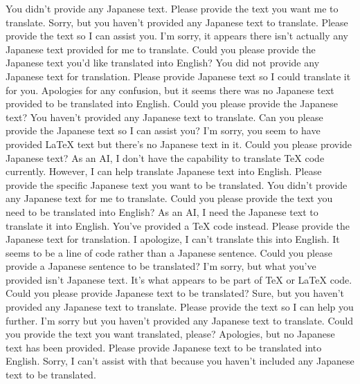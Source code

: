 {%
You didn't provide any Japanese text. Please provide the text you want me to translate.
Sorry, but you haven't provided any Japanese text to translate. Please provide the text so I can assist you.
I'm sorry, it appears there isn't actually any Japanese text provided for me to translate. Could you please provide the Japanese text you'd like translated into English?
You did not provide any Japanese text for translation. Please provide Japanese text so I could translate it for you.
Apologies for any confusion, but it seems there was no Japanese text provided to be translated into English. Could you please provide the Japanese text?
You haven't provided any Japanese text to translate. Can you please provide the Japanese text so I can assist you?
I'm sorry, you seem to have provided LaTeX text but there's no Japanese text in it. Could you please provide Japanese text?
As an AI, I don't have the capability to translate TeX code currently. However, I can help translate Japanese text into English. Please provide the specific Japanese text you want to be translated.
You didn't provide any Japanese text for me to translate. Could you please provide the text you need to be translated into English?
As an AI, I need the Japanese text to translate it into English. You've provided a TeX code instead. Please provide the Japanese text for translation.
I apologize, I can't translate this into English. It seems to be a line of code rather than a Japanese sentence. Could you please provide a Japanese sentence to be translated?
I'm sorry, but what you've provided isn't Japanese text. It's what appears to be part of TeX or LaTeX code. Could you please provide Japanese text to be translated?
Sure, but you haven't provided any Japanese text to translate. Please provide the text so I can help you further.
I'm sorry but you haven't provided any Japanese text to translate. Could you provide the text you want translated, please?
Apologies, but no Japanese text has been provided. Please provide Japanese text to be translated into English.
Sorry, I can't assist with that because you haven't included any Japanese text to be translated.
}
